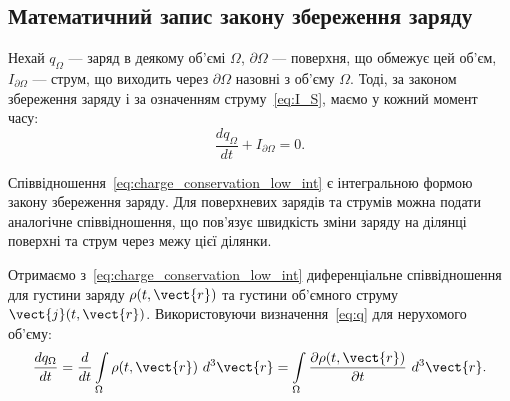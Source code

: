 \subsection*{Математичний запис закону збереження заряду}


Нехай $q_{\Omega}$ --- заряд в деякому об'ємі $\Omega$, $\partial\Omega$ --- поверхня, що обмежує цей об'єм,
$I_{\partial\Omega}$ --- струм, що виходить через $\partial\Omega$ назовні з об'єму $\Omega$. Тоді, за законом збереження заряду і за означенням
струму~\eqref{eq:I_S}, маємо у кожний момент часу:
\begin{equation}\label{eq:charge_conservation_low_int}
	\frac{dq_{\Omega}}{dt} + I_{\partial\Omega}   = 0.
\end{equation}

Співвідношення~\eqref{eq:charge_conservation_low_int} є інтегральною формою закону збереження заряду. Для поверхневих
зарядів та струмів можна подати аналогічне співвідношення, що пов'язує швидкість зміни заряду на ділянці поверхні та
струм через межу цієї ділянки.

Отримаємо з~\eqref{eq:charge_conservation_low_int} диференціальне співвідношення для густини заряду $\rho(t, \vect{r})$
та густини об'ємного струму $\vect{j}(t, \vect{r})$. Використовуючи визначення~\eqref{eq:q} для нерухомого об'єму:
\begin{equation*}
	\frac{dq_{\Omega}}{dt} = \frac{d}{dt} \int\limits_{\Omega} \rho(t, \vect{r}) \ d^3\vect{r} = \int\limits_{\Omega} \frac{\partial\rho(t, \vect{r})}{\partial
		t} \ d^3\vect{r}.
\end{equation*}

